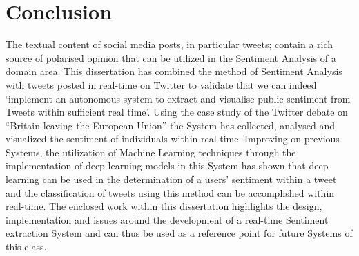 \documentclass[11pt]{report}
\begin{document}
\chapter{Conclusion}

The textual content of social media posts, in particular tweets; contain a rich source of polarised opinion that can be utilized in the Sentiment Analysis of a domain area. This dissertation has combined the method of Sentiment Analysis with tweets posted in real-time on Twitter to validate that we can indeed `implement an autonomous system to extract and visualise public sentiment from Tweets within sufficient real time'. Using the case study of the Twitter debate on ``Britain leaving the European Union'' the System has collected, analysed and visualized the sentiment of individuals within real-time. Improving on previous Systems, the utilization of Machine Learning techniques through the implementation of deep-learning models in this System has shown that deep-learning can be used in the determination of a users' sentiment within a tweet and the classification of tweets using this method can be accomplished within real-time. The enclosed work within this dissertation highlights the design, implementation and issues around the development of a real-time Sentiment extraction System and can thus be used as a reference point for future Systems of this class.
\end{document}
